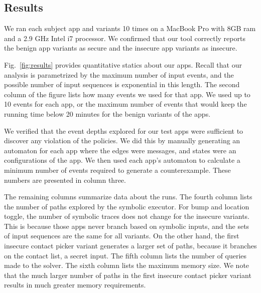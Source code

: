 \documentclass{entcs} \usepackage{entcsmacro}
\newcommand{\code}[1]{\text{\lstinline!#1!}}
\newcommand{\tfuture}{\mathcal{F}}
\begin{document}




\subsection{Results}

We ran each subject app and variants 10 times on a MacBook Pro with
8GB ram and a 2.9 GHz Intel i7 processor. We
confirmed that our tool correctly reports the benign app variants as
secure and the insecure app variants as insecure.

Fig.~\ref{fig:results} provides quantitative statics about our
apps.  Recall that our analysis is parametrized by the maximum number
of input events, and the possible number of input sequences
is exponential in this length.  The second column of the figure lists
how many events we used for that app. We used up to 10 events
for each app, or the maximum number of events that would keep the
running time below 20 minutes for the benign variants of the apps.

We verified that the event depths explored for our test apps were
sufficient to discover any violation of the policies.  We did this by
manually generating an automaton for each app where the edges were
messages, and states were an configurations of the app.  We then used
each app's automaton to calculate a minimum number of events required
to generate a counterexample.  These numbers are presented in column
three.


The remaining columns summarize data about the runs. The fourth column
lists the number of paths explored by the symbolic
executor. For bump and location toggle, the number of symbolic traces
does not change for the insecure variants. This is because those apps
never branch based on symbolic inputs, and the sets of input sequences
are the same for all variants. On the other hand, the first insecure
contact picker variant generates a larger set of paths, because it
branches on the contact list, a secret input.
The fifth column  lists the number of queries made to the solver. 
The sixth column lists the maximum memory
size. We note that the much larger number of paths in the first insecure
contact picker variant results in much greater memory requirements.
\end{document}
